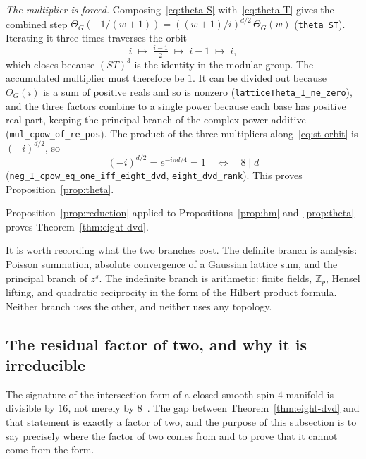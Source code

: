 \emph{The multiplier is forced.} Composing~\eqref{eq:theta-S}
with~\eqref{eq:theta-T} gives the combined step
$\Theta_G(-1/(w+1)) = ((w+1)/i)^{d/2}\,\Theta_G(w)$
(\texttt{theta\_ST}). Iterating it three times traverses the orbit
\begin{equation}
i \;\longmapsto\; \tfrac{i-1}{2} \;\longmapsto\; i-1
\;\longmapsto\; i ,
\label{eq:st-orbit}
\end{equation}
which closes because $(ST)^3$ is the identity in the modular group. The
accumulated multiplier must therefore be $1$. It can be divided out
because $\Theta_G(i)$ is a sum of positive reals and so is nonzero
(\texttt{latticeTheta\_I\_ne\_zero}), and the three factors combine to a
single power because each base has positive real part, keeping the
principal branch of the complex power additive
(\texttt{mul\_cpow\_of\_re\_pos}). The product of the three multipliers
along~\eqref{eq:st-orbit} is $(-i)^{d/2}$, so
\begin{equation}
(-i)^{d/2} = e^{-i\pi d/4} = 1
\quad\Longleftrightarrow\quad
8 \mid d
\label{eq:eight-dvd-rank}
\end{equation}
(\texttt{neg\_I\_cpow\_eq\_one\_iff\_eight\_dvd},
\texttt{eight\_dvd\_rank}). This proves Proposition~\ref{prop:theta}.

Proposition~\ref{prop:reduction} applied to Propositions~\ref{prop:hm}
and~\ref{prop:theta} proves Theorem~\ref{thm:eight-dvd}.

It is worth recording what the two branches cost. The definite branch is
analysis: Poisson summation, absolute convergence of a Gaussian lattice
sum, and the principal branch of $z^{s}$. The indefinite branch is
arithmetic: finite fields, $\mathbb{Z}_p$, Hensel lifting, and quadratic
reciprocity in the form of the Hilbert product formula. Neither branch
uses the other, and neither uses any topology.

\subsection{The residual factor of two, and why it is irreducible}
\label{sec:sig-residual}

The signature of the intersection form of a closed smooth spin
$4$-manifold is divisible by $16$, not merely by
$8$~\cite{Rokhlin1952}.
The gap between Theorem~\ref{thm:eight-dvd} and that statement is exactly
a factor of two, and the purpose of this subsection is to say precisely
where the factor of two comes from and to prove that it cannot come from
the form.

